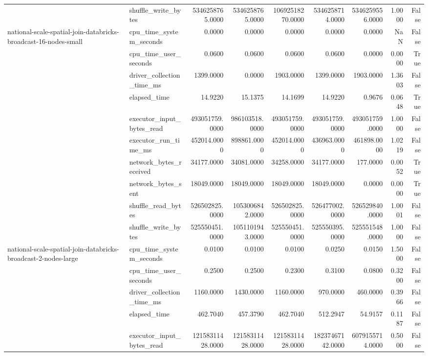 \begin{tabular}{llrrrrrrr}
 & shuffle\_write\_bytes & 5346258765.0000 & 5346258765.0000 & 10692518270.0000 & 5346258714.0000 & 5346259556.0000 & 1.0000 & False \\
\cline{1-9}
\multirow[t]{10}{*}{national-scale-spatial-join-databricks-broadcast-16-nodes-small} & cpu\_time\_system\_seconds & 0.0000 & 0.0000 & 0.0000 & 0.0000 & 0.0000 & NaN & False \\
 & cpu\_time\_user\_seconds & 0.0600 & 0.0600 & 0.0600 & 0.0600 & 0.0000 & 0.0000 & True \\
 & driver\_collection\_time\_ms & 1399.0000 & 0.0000 & 1903.0000 & 1399.0000 & 1903.0000 & 1.3603 & False \\
 & elapsed\_time & 14.9220 & 15.1375 & 14.1699 & 14.9220 & 0.9676 & 0.0648 & True \\
 & executor\_input\_bytes\_read & 493051759.0000 & 986103518.0000 & 493051759.0000 & 493051759.0000 & 493051759.0000 & 1.0000 & False \\
 & executor\_run\_time\_ms & 452014.0000 & 898861.0000 & 452014.0000 & 436963.0000 & 461898.0000 & 1.0219 & False \\
 & network\_bytes\_received & 34177.0000 & 34081.0000 & 34258.0000 & 34177.0000 & 177.0000 & 0.0052 & True \\
 & network\_bytes\_sent & 18049.0000 & 18049.0000 & 18049.0000 & 18049.0000 & 0.0000 & 0.0000 & True \\
 & shuffle\_read\_bytes & 526502825.0000 & 1053006842.0000 & 526502825.0000 & 526477002.0000 & 526529840.0000 & 1.0001 & False \\
 & shuffle\_write\_bytes & 525550451.0000 & 1051101943.0000 & 525550451.0000 & 525550395.0000 & 525551548.0000 & 1.0000 & False \\
\cline{1-9}
\multirow[t]{10}{*}{national-scale-spatial-join-databricks-broadcast-2-nodes-large} & cpu\_time\_system\_seconds & 0.0100 & 0.0100 & 0.0100 & 0.0250 & 0.0150 & 1.5000 & False \\
 & cpu\_time\_user\_seconds & 0.2500 & 0.2500 & 0.2300 & 0.3100 & 0.0800 & 0.3200 & False \\
 & driver\_collection\_time\_ms & 1160.0000 & 1430.0000 & 1160.0000 & 970.0000 & 460.0000 & 0.3966 & False \\
 & elapsed\_time & 462.7040 & 457.3790 & 462.7040 & 512.2947 & 54.9157 & 0.1187 & False \\
 & executor\_input\_bytes\_read & 12158311428.0000 & 12158311428.0000 & 12158311428.0000 & 18237467142.0000 & 6079155714.0000 & 0.5000 & False \\

\end{tabular}

